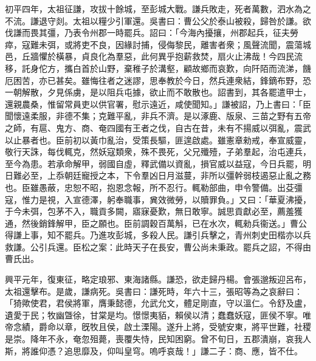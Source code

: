 \begin{pinyinscope}
初平四年，太祖征謙，攻拔十餘城，至彭城大戰。謙兵敗走，死者萬數，泗水為之不流。謙退守剡。太祖以糧少引軍還。吳書曰：曹公父於泰山被殺，歸咎於謙。欲伐謙而畏其彊，乃表令州郡一時罷兵。詔曰：「今海內擾攘，州郡起兵，征夫勞瘁，寇難未弭，或將吏不良，因緣討捕，侵侮黎民，離害者衆；風聲流聞，震蕩城邑，丘牆懼於橫暴，貞良化為羣惡，此何異乎抱薪救焚，扇火止沸哉！今四民流移，託身佗方，攜白首於山野，棄稚子於溝壑，顧故鄉而哀歎，向阡陌而流涕，饑厄困苦，亦已甚矣。雖悔往者之迷謬，思奉教於今日，然兵連衆結，鋒鏑布野，恐一朝解散，夕見係虜，是以阻兵屯據，欲止而不敢散也。詔書到，其各罷遣甲士，還親農桑，惟留常員吏以供官署，慰示遠近，咸使聞知。」謙被詔，乃上書曰：「臣聞懷遠柔服，非德不集；克難平亂，非兵不濟。是以涿鹿、版泉、三苗之野有五帝之師，有扈、鬼方、商、奄四國有王者之伐，自古在昔，未有不揚威以弭亂，震武以止暴者也。臣前初以黃巾亂治，受策長驅，匪遑啟處。雖憲章勑戒，奉宣威靈，敬行天誅，每伐輒克，然妖寇類衆，殊不畏死，父兄殲殪，子弟羣起，治屯連兵，至今為患。若承命解甲，弱國自虛，釋武備以資亂，損官威以益寇，今日兵罷，明日難必至，上忝朝廷寵授之本，下令羣凶日月滋蔓，非所以彊幹弱枝遏惡止亂之務也。臣雖愚蔽，忠恕不昭，抱恩念報，所不忍行。輒勒部曲，申令警備。出芟彊寇，惟力是視，入宣德澤，躬奉職事，兾效微勞，以贖罪負。」又曰：「華夏沸擾，于今未弭，包茅不入，職貢多闕，寤寐憂歎，無日敢寧。誠思貢獻必至，薦羞獲通，然後銷鋒解甲，臣之願也。臣前調穀百萬斛，已在水次，輒勑兵衞送。」曹公得謙上事，知不罷兵。乃進攻彭城，多殺人民。謙引兵擊之，青州刺史田楷亦以兵救謙。公引兵還。臣松之案：此時天子在長安，曹公尚未秉政。罷兵之詔，不得由曹氏出。

興平元年，復東征，略定琅邪、東海諸縣。謙恐，欲走歸丹楊。會張邈叛迎呂布，太祖還擊布。是歲，謙病死。吳書曰：謙死時，年六十三，張昭等為之哀辭曰：「猗歟使君，君侯將軍，膺秉懿德，允武允文，體足剛直，守以溫仁。令舒及盧，遺愛于民；牧幽曁徐，甘棠是均。憬憬夷貊，賴侯以清；蠢蠢妖寇，匪侯不寧。唯帝念績，爵命以章，旣牧且侯，啟土溧陽。遂升上將，受號安東，將平世難，社稷是崇。降年不永，奄忽殂薨，喪覆失恃，民知困窮。曾不旬日，五郡潰崩，哀我人斯，將誰仰憑？追思靡及，仰叫皇穹。嗚呼哀哉！」謙二子：商、應，皆不仕。


\end{pinyinscope}